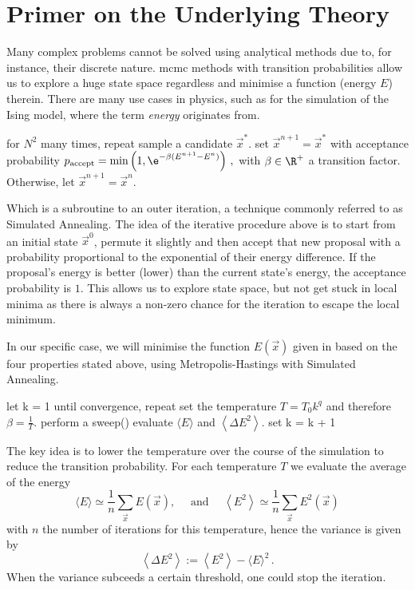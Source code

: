 \section{Primer on the Underlying Theory}
\label{sec:theory}
Many complex problems cannot be solved using analytical methods due to, for instance, their discrete nature.
\gls{mcmc} methods with transition probabilities allow us to explore a huge state space regardless and minimise a function (energy $E$) therein.
There are many use cases in physics, such as for the simulation of the Ising model, where the term \textit{energy} originates from.

\begin{algorithm}[language=pseudo,caption={\centering The Metropolis-Hastings sweep() sub-routine \parencite{metropolis, hastings}},basicstyle=\footnotesize]
for $N^2$ many times, repeat
sample a candidate $\vec{x}^*$.
set $\vec{x}^{n+1} = \vec{x}^*$ with acceptance probability
  $p_{\rm accept} = \min\left(1, \e^{-\beta (E^{n+1} - E^n)}\right)\,,$ with $\beta \in \R^+$ a transition factor.
Otherwise, let $\vec{x}^{n+1} = \vec{x}^{n}$.
\end{algorithm}

Which is a subroutine to an outer iteration, a technique commonly referred to as Simulated Annealing.
The idea of the iterative procedure above is to start from an initial state $\vec{x}^0$, permute it slightly and then accept that new proposal with a probability proportional to the exponential of their energy difference.
If the proposal's energy is better (lower) than the current state's energy, the acceptance probability is $1$.
This allows us to explore state space, but not get stuck in local minima as there is always a non-zero chance for the iteration to escape the local minimum.

In our specific case, we will minimise the function $E(\vec{x})$ given in  based on the four properties stated above, using Metropolis-Hastings with Simulated Annealing.

\begin{algorithm}[language=pseudo,caption={\centering Simulated Annealing},basicstyle=\footnotesize]
let k = 1
until convergence, repeat
set the temperature $T = T_0 k^{q}$ and therefore $\beta = \frac{1}{T}$.
perform a sweep()
evaluate $\langle E\rangle$ and $\left\langle\Delta E^2\right\rangle$.
set k = k + 1
\end{algorithm}

The key idea is to lower the temperature over the course of the simulation to reduce the transition probability.
For each temperature $T$ we evaluate the average of the energy
$$\langle E\rangle \simeq \frac{1}{n} \sum_{\vec{x}} E(\vec{x}), \quad \text { and } \quad\left\langle E^2\right\rangle \simeq \frac{1}{n} \sum_{\vec{x}} E^2(\vec{x})$$
with $n$ the number of iterations for this temperature, hence the variance is given by
$$\left\langle\Delta E^2\right\rangle:=\left\langle E^2\right\rangle-\langle E\rangle^2 \,.$$
When the variance subceeds a certain threshold, one could stop the iteration.
